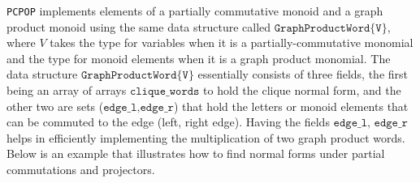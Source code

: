 \texttt{PCPOP} implements elements of a partially commutative monoid and a graph product monoid using the same data structure called $\texttt{GraphProductWord\{V\}}$, where $V$ takes the type for variables when it is a partially-commutative monomial and the type for monoid elements when it is a graph product monomial. The data structure $\texttt{GraphProductWord\{V\}}$ essentially consists of three fields, the first being an array of arrays $\texttt{clique\_words}$ to hold the clique normal form, and the other two are sets ($\texttt{edge\_l,edge\_r}$) that hold the letters or monoid elements that can be commuted to the edge (left, right edge). Having the fields $\texttt{edge\_l, edge\_r}$ helps in efficiently implementing the multiplication of two graph product words. Below is an example that illustrates how to find normal forms under partial commutations and projectors.
